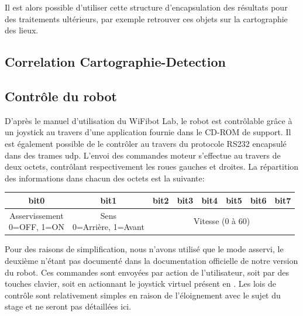 			Il est alors possible d'utiliser cette structure d'encapsulation des résultats pour des traitements ultérieurs, par exemple retrouver ces objets sur la cartographie des lieux.
		
		\subsection{Correlation Cartographie-Detection}
		\label{sub:corr}
		
		
			
		\subsection{Contrôle du robot}
		
			D'après le manuel d'utilisation du WiFibot Lab\cite{wifibot}, le robot est contrôlable grâce à un joystick au travers d'une application fournie dans le CD-ROM de support. Il est également possible de le contrôler au travers du protocole RS232\cite{rs232} encapsulé dans des trames \gls{udp}. L'envoi des commandes moteur s'effectue au travers de deux octets, contrôlant respectivement les roues gauches et droites. La répartition des informations dans chacun des octets est la suivante:
			\begin{center}
				\scriptsize
				\begin{tabular}[h]{|c||c||c|c|c|c|c|c|}
					\toprule
					bit0 & bit1 & bit2 & bit3 & bit4 & bit5 & bit6 & bit7 \\
					\midrule
					\specialcell{Asservissement\\ 0=OFF, 1=ON} &
					\specialcell{Sens\\ 0=Arrière, 1=Avant} &
					\multicolumn{6}{c|}{Vitesse (0 à 60)} \\
					\bottomrule
				\end{tabular}
			\end{center}
			Pour des raisons de simplification, nous n'avons utilisé que le mode asservi, le deuxième n'étant pas documenté dans la documentation officielle de notre version du robot.
			Ces commandes sont envoyées par action de l'utilisateur, soit par des touches clavier, soit en actionnant le joystick virtuel présent en \todoref.
			Les lois de contrôle sont relativement simples en raison de l'éloignement avec le sujet du stage et ne seront pas détaillées ici.
